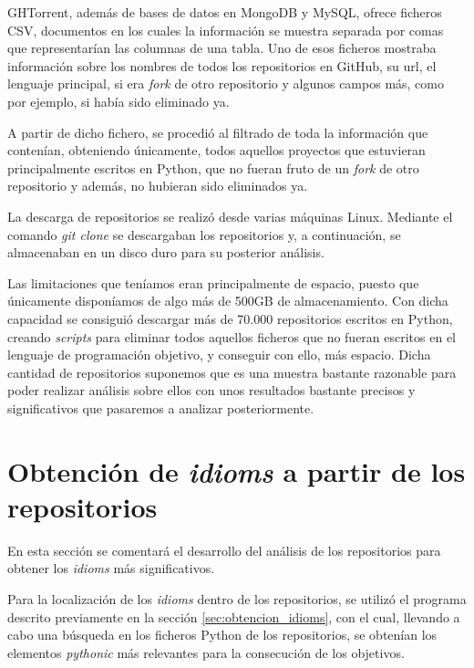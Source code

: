 \documentclass[a4paper, 12pt]{book}
\begin{document}
GHTorrent, además de bases de datos en MongoDB y MySQL, ofrece ficheros CSV, documentos en los cuales la información se muestra separada por comas que representarían las columnas de una tabla. Uno de esos ficheros mostraba información sobre los nombres de todos los repositorios en GitHub, su url, el lenguaje principal, si era \textit{fork} de otro repositorio y algunos campos más, como por ejemplo, si había sido eliminado ya.

A partir de dicho fichero, se procedió al filtrado de toda la información que contenían, obteniendo únicamente, todos aquellos proyectos que estuvieran principalmente escritos en Python, que no fueran fruto de un \textit{fork} de otro repositorio y además, no hubieran sido eliminados ya.

La descarga de repositorios se realizó desde varias máquinas Linux. Mediante el comando \textit{git clone} se descargaban los repositorios y, a continuación, se almacenaban en un disco duro para su posterior análisis.

Las limitaciones que teníamos eran principalmente de espacio, puesto que únicamente disponíamos de algo más de 500GB de almacenamiento. Con dicha capacidad se consiguió descargar más de 70.000 repositorios escritos en Python, creando \textit{scripts} para eliminar todos aquellos ficheros que no fueran escritos en el lenguaje de programación objetivo, y conseguir con ello, más espacio. Dicha cantidad de repositorios suponemos que es una muestra bastante razonable para poder realizar análisis sobre ellos con unos resultados bastante precisos y significativos que pasaremos a analizar posteriormente.



\section{Obtención de \textit{idioms} a partir de los repositorios}
\label{sec:find_idioms_repos}

En esta sección se comentará el desarrollo del análisis de los repositorios para obtener los \textit{idioms} más significativos.

Para la localización de los \textit{idioms} dentro de los repositorios, se utilizó el programa descrito previamente en la sección \ref{sec:obtencion_idioms}, con el cual, llevando a cabo una búsqueda en los ficheros Python de los repositorios, se obtenían los elementos \textit{pythonic} más relevantes para la consecución de los objetivos.
\end{document}
